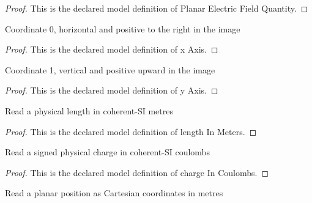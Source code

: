 \begin{proof}
  This is the declared model definition of Planar Electric Field Quantity.
\end{proof}
\begin{definition}[x Axis]
  \label{def:physics:phyx-mini-0833:phyxminiproblems-problemphyxmini0833-xaxis}
  Coordinate 0, horizontal and positive to the right in the image
\end{definition}
\begin{proof}
  This is the declared model definition of x Axis.
\end{proof}
\begin{definition}[y Axis]
  \label{def:physics:phyx-mini-0833:phyxminiproblems-problemphyxmini0833-yaxis}
  Coordinate 1, vertical and positive upward in the image
\end{definition}
\begin{proof}
  This is the declared model definition of y Axis.
\end{proof}
\begin{definition}
  \label{def:physics:phyx-mini-0833:phyxminiproblems-problemphyxmini0833-lengthinmeters}
  Read a physical length in coherent-SI metres
\end{definition}
\begin{proof}
  This is the declared model definition of length In Meters.
\end{proof}
\begin{definition}
  \label{def:physics:phyx-mini-0833:phyxminiproblems-problemphyxmini0833-chargeincoulombs}
  Read a signed physical charge in coherent-SI coulombs
\end{definition}
\begin{proof}
  This is the declared model definition of charge In Coulombs.
\end{proof}
\begin{definition}
  \label{def:physics:phyx-mini-0833:phyxminiproblems-problemphyxmini0833-positionvectorinmeters}
  Read a planar position as Cartesian coordinates in metres
\end{definition}
